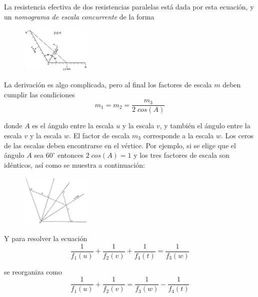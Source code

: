 \documentclass[letterpaper,11pt]{article}
\begin{document}
\begin{enumerate}
    La resistencia efectiva de dos resistencias paralelas está dada por esta 
    ecuación, y un \textit{nomograma de escala concurrente} de la forma 

    \begin{figure}[htb]
        \centering
        \includegraphics[width=0.3\textwidth]{./imagenes/image016.jpg}
    \end{figure} 
    
    La derivación es algo complicada, pero al final los factores de escala $m$
    deben cumplir las condiciones
    \begin{equation*}
        m_{1} = m_{2} = \frac{m_{3}}{2 \; cos (A)}
    \end{equation*}

    donde $A$ es el ángulo entre la escala $u$ y la escala $v$, y también el 
    ángulo entre la escala $v$ y la escala $w$. El factor de escala $m_{3}$
    corresponde a la escala $w$. Los ceros de las escalas deben encontrarse
    en el vértice. Por ejemplo, si se elige que el ángulo $A$ sea $60^{\circ}$
    entonces $2 \; cos (A) = 1$ y los tres factores de escala son idénticos,
    así como se muestra a continuación:
    \begin{figure}[htb]
        \centering
        \includegraphics[width=0.3\textwidth]{./imagenes/image017.jpg}
    \end{figure} 

    Y para resolver la ecuación
    \begin{equation*}
        \frac{1}{f_{1} (u)} +  \frac{1}{f_{2} (v)} + \frac{1}{f_{4} (t)} =
        \frac{1}{f_{3} (w)}
    \end{equation*}

    se reorganiza como 
    \begin{equation*}
        \frac{1}{f_{1} (u)} + \frac{1}{f_{2} (v)} = 
        \frac{1}{f_{3} (w)} - \frac{1}{f_{4} (t)}
    \end{equation*}


\end{enumerate}
\end{document}

